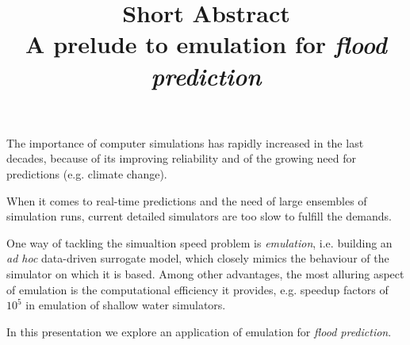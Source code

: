 \documentclass{article}
\title{%
  \bf{Short Abstract}\\%
  \large A prelude to emulation for \emph{flood prediction}}
\author{}
\date{}
\begin{document}
\maketitle
\thispagestyle{fancy}

The importance of computer simulations has rapidly increased in the last decades, because of its improving reliability and of the growing need for predictions (e.g. climate change).

When it comes to real-time predictions and the need of large ensembles of simulation runs, current detailed simulators are too slow to fulfill the demands.

One way of tackling the simualtion speed problem is \emph{emulation}, i.e. building an \emph{ad hoc} data-driven surrogate model, which closely mimics the behaviour of the simulator on which it is based.
Among other advantages, the most alluring aspect of emulation is the computational efficiency it provides, e.g. speedup factors of $10^5$ in emulation of shallow water simulators.

In this presentation we explore an application of emulation for \emph{flood prediction}.
\end{document}
